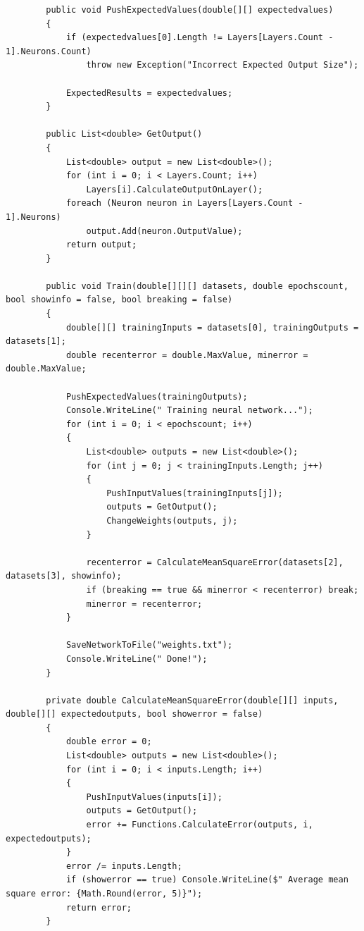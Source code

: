 \documentclass[12pt,a4paper]{article}
\begin{document}
\begin{lstlisting}
        public void PushExpectedValues(double[][] expectedvalues) 
        {
            if (expectedvalues[0].Length != Layers[Layers.Count - 1].Neurons.Count) 
                throw new Exception("Incorrect Expected Output Size");

            ExpectedResults = expectedvalues;
        }

        public List<double> GetOutput()
        {
            List<double> output = new List<double>();
            for (int i = 0; i < Layers.Count; i++)
                Layers[i].CalculateOutputOnLayer();
            foreach (Neuron neuron in Layers[Layers.Count - 1].Neurons)
                output.Add(neuron.OutputValue);
            return output;
        }

        public void Train(double[][][] datasets, double epochscount, bool showinfo = false, bool breaking = false)
        {
            double[][] trainingInputs = datasets[0], trainingOutputs = datasets[1];
            double recenterror = double.MaxValue, minerror = double.MaxValue;

            PushExpectedValues(trainingOutputs);
            Console.WriteLine(" Training neural network...");
            for (int i = 0; i < epochscount; i++)
            {
                List<double> outputs = new List<double>();
                for (int j = 0; j < trainingInputs.Length; j++)
                {
                    PushInputValues(trainingInputs[j]);
                    outputs = GetOutput();
                    ChangeWeights(outputs, j);
                }

                recenterror = CalculateMeanSquareError(datasets[2], datasets[3], showinfo);
                if (breaking == true && minerror < recenterror) break;
                minerror = recenterror;
            }

            SaveNetworkToFile("weights.txt");
            Console.WriteLine(" Done!");
        }

        private double CalculateMeanSquareError(double[][] inputs, double[][] expectedoutputs, bool showerror = false)
        {
            double error = 0; 
            List<double> outputs = new List<double>();
            for (int i = 0; i < inputs.Length; i++)
            {
                PushInputValues(inputs[i]);
                outputs = GetOutput();
                error += Functions.CalculateError(outputs, i, expectedoutputs);
            }
            error /= inputs.Length;
            if (showerror == true) Console.WriteLine($" Average mean square error: {Math.Round(error, 5)}");
            return error;
        }


\end{lstlisting}
\end{document}
